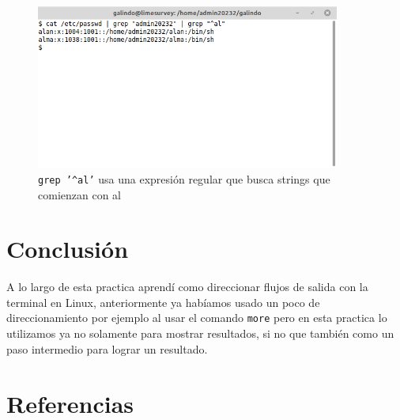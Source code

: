\documentclass[11pt]{article}
\begin{document}
\begin{figure}[htbp]
\centering
\includegraphics[width=10cm]{img/15.png}
\caption[\texttt{grep '\textasciicircum{}al'}]{\texttt{grep '\textasciicircum{}al'} usa una expresión regular que busca strings que comienzan con al}
\end{figure}


\section{Conclusión}
\label{sec:orgf3993e3}
A lo largo de esta practica aprendí como direccionar flujos de salida con la 
terminal en Linux, anteriormente ya habíamos usado un poco de direccionamiento
por ejemplo al usar el comando \texttt{more} pero en esta practica lo utilizamos ya no 
solamente para mostrar resultados, si no que también como un paso intermedio para
lograr un resultado.

\section{Referencias}
\label{sec:org7008125}
\printbibliography[heading=none]
\end{document}
